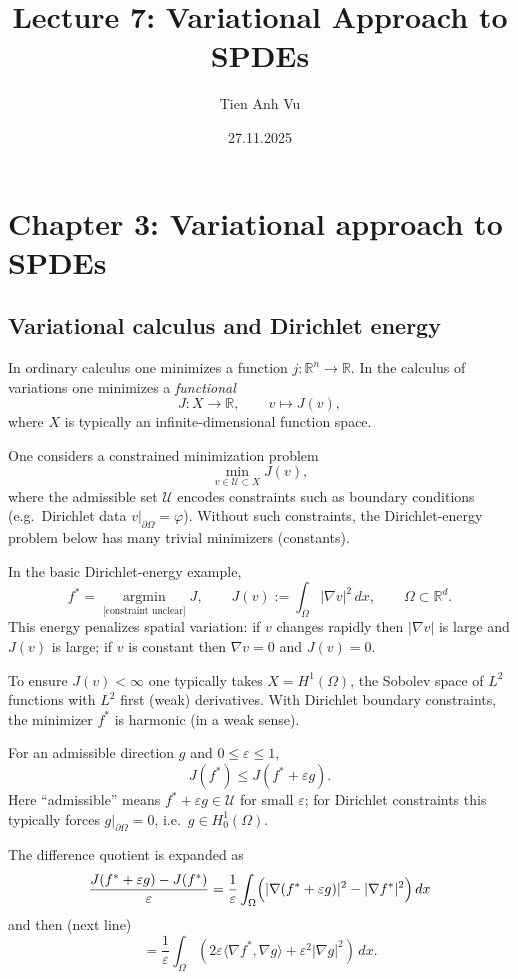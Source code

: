 \documentclass[11pt]{article}
\title{Lecture 7: Variational Approach to SPDEs}
\date{27.11.2025}
\author{Tien Anh Vu}
\theoremstyle{definition}
\theoremstyle{remark}
\begin{document}
\maketitle

\section*{Chapter 3: Variational approach to SPDEs}

\subsection*{Variational calculus and Dirichlet energy}

In ordinary calculus one minimizes a function $j:\mathbb{R}^n\to\mathbb{R}$. In the calculus of variations one minimizes a \emph{functional}
\[
J:X\to\mathbb{R},
\qquad
v\mapsto J(v),
\]
where $X$ is typically an infinite-dimensional function space.

One considers a constrained minimization problem
\[
\min_{v\in \mathcal U\subset X} J(v),
\]
where the admissible set $\mathcal U$ encodes constraints such as boundary conditions (e.g.\ Dirichlet data $v|_{\partial\Omega}=\varphi$). Without such constraints, the Dirichlet-energy problem below has many trivial minimizers (constants).

In the basic Dirichlet-energy example,
\[
f^\ast
=
\operatorname*{argmin}_{\text{[constraint unclear]}}
J,
\qquad
J(v)
:=
\int_\Omega |\nabla v|^2\,dx,
\qquad
\Omega \subset \mathbb{R}^d.
\]
This energy penalizes spatial variation: if $v$ changes rapidly then $|\nabla v|$ is large and $J(v)$ is large; if $v$ is constant then $\nabla v=0$ and $J(v)=0$.

To ensure $J(v)<\infty$ one typically takes $X=H^1(\Omega)$, the Sobolev space of $L^2$ functions with $L^2$ first (weak) derivatives. With Dirichlet boundary constraints, the minimizer $f^\ast$ is harmonic (in a weak sense).

For an admissible direction $g$ and $0\le \varepsilon \le 1$,
\[
J(f^\ast)\le J(f^\ast+\varepsilon g).
\]
Here ``admissible'' means $f^\ast+\varepsilon g\in\mathcal U$ for small $\varepsilon$; for Dirichlet constraints this typically forces $g|_{\partial\Omega}=0$, i.e.\ $g\in H_0^1(\Omega)$.

The difference quotient is expanded as
\[
\frac{J(f^\ast+\varepsilon g)-J(f^\ast)}{\varepsilon}
=
\frac{1}{\varepsilon}
\int_\Omega
\Bigl(
|\nabla(f^\ast+\varepsilon g)|^2-|\nabla f^\ast|^2
\Bigr)\,dx
\]
and then (next line)
\[
=
\frac{1}{\varepsilon}
\int_\Omega
\left(
2\varepsilon \langle \nabla f^\ast,\nabla g\rangle
+ \varepsilon^2 |\nabla g|^2
\right)\,dx.
\]
\end{document}
